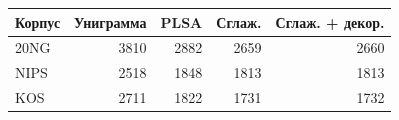 \begin{tabular}{lrrrr}\toprule
Корпус & Униграмма & PLSA & Сглаж. & Сглаж. + декор.\\\midrule
20NG & 3810 & 2882 & 2659 & 2660\\
NIPS & 2518 & 1848 & 1813 & 1813\\
KOS & 2711 & 1822 & 1731 & 1732\\
\bottomrule\end{tabular}
